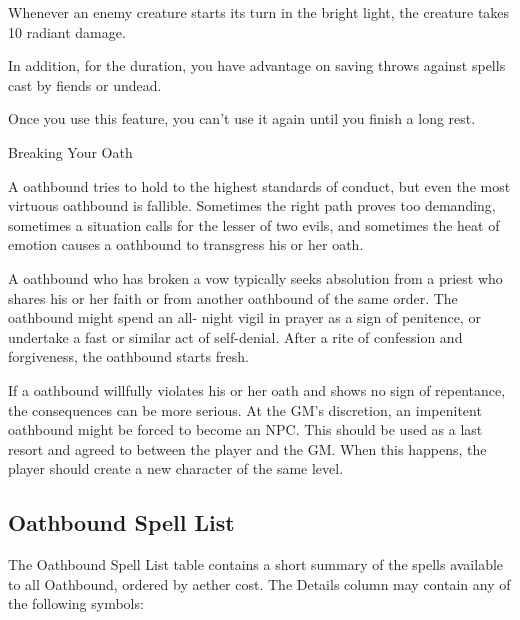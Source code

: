 Whenever an enemy creature starts its turn in the bright light, the creature takes 10 radiant damage.

In addition, for the duration, you have advantage on saving throws against spells cast by fiends or undead.

Once you use this feature, you can't use it again until you finish a long rest.

\begin{DndComment}{Breaking Your Oath}

A oathbound tries to hold to the highest standards of conduct, but even the most virtuous oathbound is fallible. Sometimes the right path proves too demanding, sometimes a situation calls for the lesser of two evils, and sometimes the heat of emotion causes a oathbound to transgress his or her oath.

A oathbound who has broken a vow typically seeks absolution from a priest who shares his or her faith or from another oathbound of the same order. The oathbound might spend an all- night vigil in prayer as a sign of penitence, or undertake a fast or similar act of self-denial. After a rite of confession and forgiveness, the oathbound starts fresh.

If a oathbound willfully violates his or her oath and shows no sign of repentance, the consequences can be more serious. At the GM's discretion, an impenitent oathbound might be forced to become an NPC. This should be used as a last resort and agreed to between the player and the GM. When this happens, the player should create a new character of the same level.
\end{DndComment}

\subsection{Oathbound Spell List}
The Oathbound Spell List table contains a short summary of the spells available to all Oathbound, ordered by aether cost. The Details column may contain any of the following symbols:

